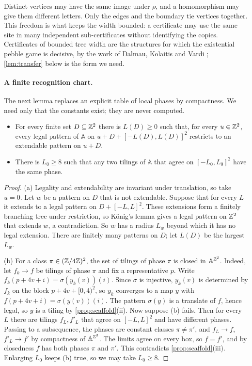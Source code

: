 Distinct vertices may have the same image under $\rho$, and a homomorphism may give them different letters. Only the edges and the boundary tie vertices together. This freedom is what keeps the width bounded: a certificate may use the same site in many independent sub-certificates without identifying the copies. Certificates of bounded tree width are the structures for which the existential pebble game is decisive, by the work of Dalmau, Kolaitis and Vardi \cite{DKV02}; \cref{lem:transfer} below is the form we need.

\paragraph{A finite recognition chart.} The next lemma replaces an explicit table of local phases by compactness. We need only that the constants exist; they are never computed.

\begin{lemma}\label{scf:chart}
\begin{itemize}
\item[(a)] For every finite set $D\subseteq\mathbb{Z}^2$ there is $L(D)\ge0$ such that, for every $u\in\mathbb{Z}^2$, every legal pattern of $\mathbb A$ on $u+D+[-L(D),L(D)]^2$ restricts to an extendable pattern on $u+D$.
\item[(b)] There is $L_0\ge8$ such that any two tilings of $\mathbb A$ that agree on $[-L_0,L_0]^2$ have the same phase.
\end{itemize}
\end{lemma}

\begin{proof}
(a) Legality and extendability are invariant under translation, so take $u=0$. Let $w$ be a pattern on $D$ that is not extendable. Suppose that for every $L$ it extends to a legal pattern on $D+[-L,L]^2$. These extensions form a finitely branching tree under restriction, so K\"onig's lemma gives a legal pattern on $\mathbb{Z}^2$ that extends $w$, a contradiction. So $w$ has a radius $L_w$ beyond which it has no legal extension. There are finitely many patterns on $D$; let $L(D)$ be the largest $L_w$.

(b) For a class $\pi\in(\mathbb{Z}/4\mathbb{Z})^2$, the set of tilings of phase $\pi$ is closed in $\mathbb A^{\mathbb{Z}^2}$. Indeed, let $f_k\to f$ be tilings of phase $\pi$ and fix a representative $p$. Write $f_k(p+4v+i)=\sigma(y_k(v))(i)$. Since $\sigma$ is injective, $y_k(v)$ is determined by $f_k$ on the block $p+4v+[0,4)^2$, so $y_k$ converges to a map $y$ with $f(p+4v+i)=\sigma(y(v))(i)$. The pattern $\sigma(y)$ is a translate of $f$, hence legal, so $y$ is a tiling by \cref{prop:scaffold}(ii). Now suppose (b) fails. Then for every $L$ there are tilings $f_L,f'_L$ that agree on $[-L,L]^2$ and have different phases. Passing to a subsequence, the phases are constant classes $\pi\ne\pi'$, and $f_L\to f$, $f'_L\to f'$ by compactness of $\mathbb A^{\mathbb{Z}^2}$. The limits agree on every box, so $f=f'$, and by closedness $f$ has both phases $\pi$ and $\pi'$. This contradicts \cref{prop:scaffold}(iii). Enlarging $L_0$ keeps (b) true, so we may take $L_0\ge8$.
\end{proof}

